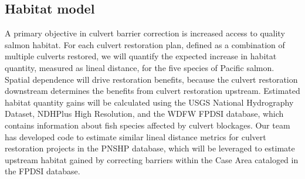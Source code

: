 
\subsection*{Habitat model}

A primary objective in culvert barrier correction is increased access to quality salmon habitat. For each culvert restoration plan, defined as a combination of multiple culverts restored, we will quantify the expected increase in habitat quantity, measured as lineal distance, for the five species of Pacific salmon. Spatial dependence will drive restoration benefits, because the culvert restoration downstream determines the benefits from culvert restoration upstream. Estimated habitat quantity gains will be calculated using the USGS National Hydrography Dataset, NDHPlus High Resolution, and the WDFW FPDSI database, which contains information about fish species affected by culvert blockages. Our team has developed code to estimate similar lineal distance metrics for culvert restoration projects in the PNSHP database, which will be leveraged to estimate upstream habitat gained by correcting barriers within the Case Area cataloged in the FPDSI database. 


